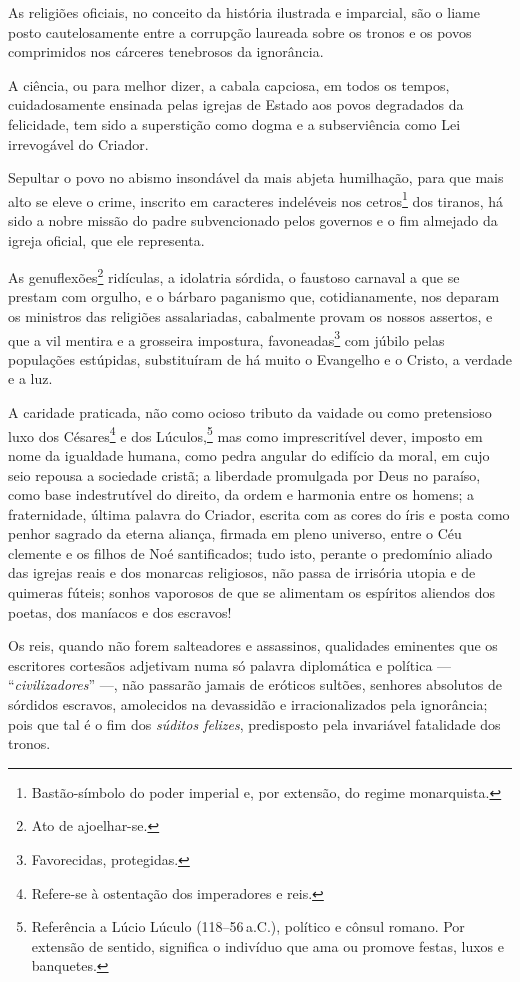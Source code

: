 As religiões oficiais, no conceito da história ilustrada e imparcial,
são o liame posto cautelosamente entre a corrupção laureada sobre os
tronos e os povos comprimidos nos cárceres tenebrosos da ignorância.

A ciência, ou para melhor dizer, a cabala capciosa, em todos os tempos,
cuidadosamente ensinada pelas igrejas de Estado aos povos degradados da
felicidade, tem sido a superstição como dogma e a subserviência como Lei
irrevogável do Criador.

Sepultar o povo no abismo insondável da mais abjeta humilhação, para que
mais alto se eleve o crime, inscrito em caracteres indeléveis nos
cetros\footnote{Bastão-símbolo do poder imperial e, por extensão,
  do regime monarquista.} dos tiranos, há sido a nobre missão do padre
subvencionado pelos governos e o fim almejado da igreja oficial, que ele
representa.

As genuflexões\footnote{Ato de ajoelhar-se.} ridículas, a idolatria
sórdida, o faustoso carnaval a que se prestam com orgulho, e o bárbaro
paganismo que, cotidianamente, nos deparam os ministros das religiões
assalariadas, cabalmente provam os nossos assertos, e que a vil mentira
e a grosseira impostura, favoneadas\footnote{Favorecidas, protegidas.}
com júbilo pelas populações estúpidas, substituíram de há muito o
Evangelho e o Cristo, a verdade e a luz.

A caridade praticada, não como ocioso tributo da vaidade ou como
pretensioso luxo dos Césares\footnote{Refere-se à ostentação dos
  imperadores e reis.} e dos Lúculos,\footnote{Referência a Lúcio
  Lúculo (118--56\,a.C.), político e cônsul romano. Por extensão de
  sentido, significa o indivíduo que ama ou promove festas, luxos e
  banquetes.} mas como imprescritível dever, imposto em nome da
igualdade humana, como pedra angular do edifício da moral, em cujo seio
repousa a sociedade cristã; a liberdade promulgada por Deus no paraíso,
como base indestrutível do direito, da ordem e harmonia entre os homens;
a fraternidade, última palavra do Criador, escrita com as cores do íris
e posta como penhor sagrado da eterna aliança, firmada em pleno
universo, entre o Céu clemente e os filhos de Noé santificados; tudo
isto, perante o predomínio aliado das igrejas reais e dos monarcas
religiosos, não passa de irrisória utopia e de quimeras fúteis; sonhos
vaporosos de que se alimentam os espíritos aliendos dos poetas, dos
maníacos e dos escravos!

Os reis, quando não forem salteadores e assassinos, qualidades eminentes
que os escritores cortesãos adjetivam numa só palavra diplomática e
política --- ``\emph{civilizadores}'' ---, não passarão jamais de eróticos %
sultões, senhores absolutos de sórdidos escravos, amolecidos na
devassidão e irracionalizados pela ignorância; pois que tal é o fim dos
\emph{súditos felizes}, predisposto pela invariável fatalidade dos
tronos.


